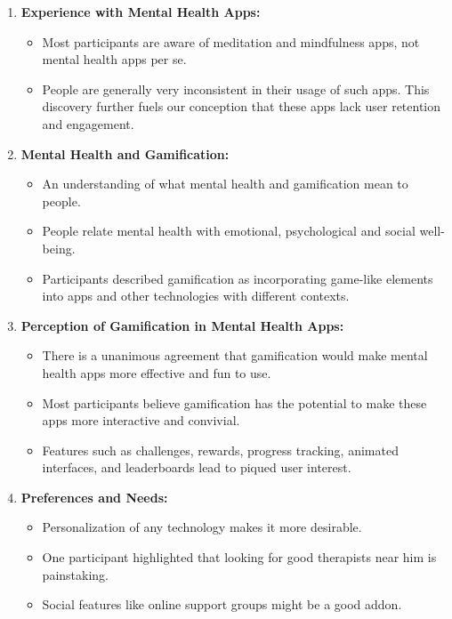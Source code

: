 \documentclass[manuscript,screen,review]{acmart}
\begin{document}
\begin{enumerate}
    \item \textbf{Experience with Mental Health Apps:}
    \begin{itemize}
        \item Most participants are aware of meditation and mindfulness apps, not mental health apps per se.
        \item People are generally very inconsistent in their usage of such apps. This discovery further fuels our conception that these apps lack user retention and engagement.
    \end{itemize}
    
    \item \textbf{Mental Health and Gamification:}
    \begin{itemize}
        \item An understanding of what mental health and gamification mean to people.
        \item People relate mental health with emotional, psychological and social well-being.
        \item Participants described gamification as incorporating game-like elements into apps and other technologies with different contexts.
    \end{itemize}
    
    \item \textbf{Perception of Gamification in Mental Health Apps:}
    \begin{itemize}
        \item There is a unanimous agreement that gamification would make mental health apps more effective and fun to use.
        \item Most participants believe gamification has the potential to make these apps more interactive and convivial.
        \item Features such as challenges, rewards, progress tracking, animated interfaces, and leaderboards lead to piqued user interest.
    \end{itemize}
    
    \item \textbf{Preferences and Needs:}
    \begin{itemize}
        \item Personalization of any technology makes it more desirable.
        \item One participant highlighted that looking for good therapists near him is painstaking.
        \item Social features like online support groups might be a good addon.
    \end{itemize}
    

\end{enumerate}
\end{document}
